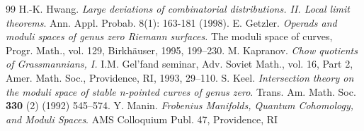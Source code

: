 \documentclass[11pt,letterpaper]{amsart}
\numberwithin{equation}{section}
\theoremstyle{definition}
\begin{document}
\begin{thebibliography}{99}
     H.-K. Hwang. {\em Large deviations of combinatorial distributions. II. Local limit theorems}. Ann. Appl. Probab. 8(1): 163-181 (1998).
     E. Getzler. {\em Operads and moduli spaces of genus zero Riemann surfaces.} The moduli space of curves, Progr. Math., vol. 129, Birkh\"auser, 1995, 199--230.
     M. Kapranov. {\em Chow quotients of Grassmannians, I.} I.M. Gel’fand seminar, Adv.
Soviet Math., vol. 16, Part 2, Amer. Math. Soc., Providence, RI, 1993, 29--110.
     S. Keel. {\em Intersection theory on the moduli space of stable n-pointed curves of genus zero}. Trans. Am. Math. Soc. \textbf{330} (2) (1992) 545--574.
     Y. Manin. {\em Frobenius Manifolds, Quantum Cohomology, and Moduli Spaces}. AMS Colloquium Publ. 47, Providence, RI
\end{thebibliography}
\end{document}
